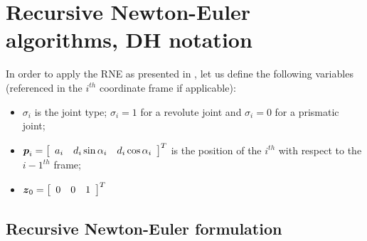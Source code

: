 \chapter{Recursive Newton-Euler algorithms, DH notation}
\label{sec:rnea}

In order to apply the RNE as presented in \cite{Murray86}, 
let us define the following variables 
(referenced in the $i^{th}$ coordinate frame if applicable):
\begin{itemize}
\item $\sigma_i$ is the joint type; $\sigma_i = 1$ for a revolute
  joint and $\sigma_i = 0$ for a prismatic joint;
\item $\mbold{p}_i = \matr{ccc}{ a_i & d_i \sin \alpha_i & d_i \cos \alpha_i}^T$ is the
position of the $i^{th}$ with respect to the $i-1^{th}$ frame;
\item $\mbold{z}_0 = \matr{ccc}{0 & 0 & 1}^T $
\end{itemize}


\section{Recursive Newton-Euler formulation}
\label{sec:rne}

